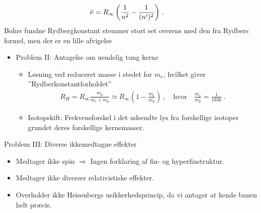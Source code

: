\begin{align*}
    \Tilde{\nu} &= R_\infty \left(\frac{1}{n^2} - \frac{1}{(n')^2}\right) \: .
\end{align*}
Bohrs fundne Rydbergkonstant stemmer stort set overens med den fra Rydbers formel, men der er en lille afvigelse
\begin{itemize}
    \item Problem II: Antagelse om uendelig tung kerne
    \begin{itemize}
        \item Løsning ved reduceret masse i stedet for $m_e$, hvilket giver ''Rydberkonstantforholdet''
        \begin{align*}
            R_H = R_\infty \frac{m_p}{m_e + m_p} \simeq R_\infty \left(1 - \frac{m_e}{m_p}\right) \: , \quad \text{hvor} \quad \frac{m_e}{m_p} = \frac{1}{1836} \: .
        \end{align*}
        \item Isotopskift: Frekvensforskel i det udsendte lys fra forskellige isotoper grundet deres forskellige kernemasser.
    \end{itemize}
\end{itemize}
Problem III: Diverse ikkemedtagne effekter
\begin{itemize}
    \item Medtager ikke spin $\Rightarrow$ Ingen forklaring af fin- og hyperfinstruktur.
    \item Medtager ikke diverser relativistiske effekter.
    \item Overholder ikke Heisenbergs usikkerhedsprincip, da vi antager at kende banen helt præcis.
\end{itemize}
\normalsize